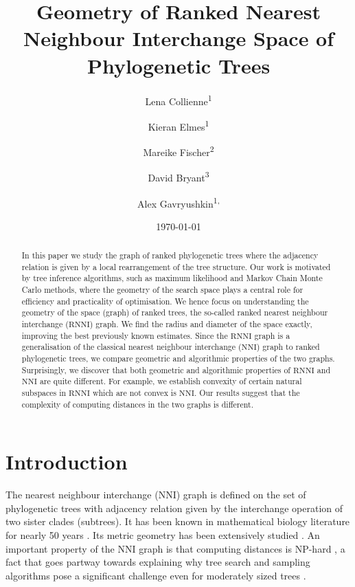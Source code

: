 \documentclass{amsart}
\title[Ranked Nearest Neighbour Interchange]{Geometry of Ranked Nearest Neighbour Interchange Space of Phylogenetic Trees}
\date{\today}
\author{Lena Collienne\textsuperscript{1}}
\author{Kieran Elmes\textsuperscript{1}}
\author{Mareike Fischer\textsuperscript{2}}
\author{David Bryant\textsuperscript{3}}
\author{Alex Gavryushkin\textsuperscript{1, \Letter}}
\newcommand{\nni}{\mathrm{NNI}}
\newcommand{\rnni}{\mathrm{RNNI}}
\begin{document}
\begin{abstract}
In this paper we study the graph of ranked phylogenetic trees where the adjacency relation is given by a local rearrangement of the tree structure.
Our work is motivated by tree inference algorithms, such as maximum likelihood and Markov Chain Monte Carlo methods, where the geometry of the search space plays a central role for efficiency and practicality of optimisation.
We hence focus on understanding the geometry of the space (graph) of ranked trees, the so-called ranked nearest neighbour interchange ($\rnni$) graph.
We find the radius and diameter of the space exactly, improving the best previously known estimates.
Since the $\rnni$ graph is a generalisation of the classical nearest neighbour interchange ($\nni$) graph to ranked phylogenetic trees, we compare geometric and algorithmic properties of the two graphs.
Surprisingly, we discover that both geometric and algorithmic properties of $\rnni$ and $\nni$ are quite different.
For example, we establish convexity of certain natural subspaces in $\rnni$ which are not convex is $\nni$.
Our results suggest that the complexity of computing distances in the two graphs is different.
\end{abstract}


\maketitle

\section{Introduction}

The nearest neighbour interchange ($\nni$) graph is defined on the set of phylogenetic trees with adjacency relation given by the interchange operation of two sister clades (subtrees).
It has been known in mathematical biology literature for nearly 50 years \autocite{Robinson1971-ql,Moore1973-kk}.
Its metric geometry has been extensively studied \autocite{Dasgupta2000-xa, Li1996-zw, Gordon2013-fw, De_Jong2016-al}.
An important property of the $\nni$ graph is that computing distances is NP-hard \autocite{Dasgupta2000-xa}, a fact that goes partway towards explaining why tree search and sampling algorithms pose a significant challenge even for moderately sized trees
\autocite{Whidden2016-kl}.
\end{document}
